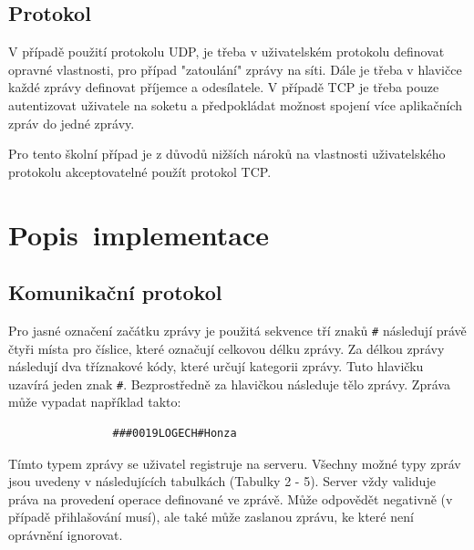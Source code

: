 \documentclass[12pt, a4paper]{article}
\begin{document}
\subsection{Protokol}
V případě použití protokolu UDP, je třeba v uživatelském protokolu definovat opravné vlastnosti, pro případ "zatoulání" zprávy na síti. Dále je třeba v hlavičce každé zprávy definovat příjemce a odesílatele. V případě TCP je třeba pouze autentizovat uživatele na soketu a předpokládat možnost spojení více aplikačních zpráv do jedné zprávy.

Pro tento školní případ je z důvodů nižších nároků na vlastnosti uživatelského protokolu akceptovatelné použít protokol TCP. 

\section{Popis~implementace} %


\subsection{Komunikační protokol}

Pro jasné označení začátku zprávy je použitá sekvence tří znaků \texttt{\#} následují právě čtyři místa pro číslice, které označují celkovou délku zprávy. Za délkou zprávy následují dva tříznakové kódy, které určují kategorii zprávy. Tuto hlavičku uzavírá jeden znak \texttt{\#}. Bezprostředně za hlavičkou následuje tělo zprávy. Zpráva může vypadat například takto:

\begin{verbatim}
                ###0019LOGECH#Honza
\end{verbatim}

Tímto typem zprávy se uživatel registruje na serveru. Všechny možné typy zpráv jsou uvedeny v následujících tabulkách (Tabulky 2 - 5). Server vždy validuje práva na provedení operace definované ve zprávě. Může odpovědět negativně (v případě přihlašování musí), ale také může zaslanou zprávu, ke které není oprávnění ignorovat.
\end{document}

